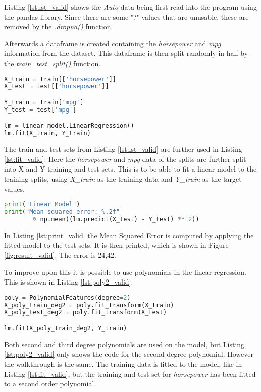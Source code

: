 Listing \ref{lst:lst_valid} shows the \emph{Auto} data being first read into the program using the pandas library. Since there are some "?" values that are unusable, these are removed by the \emph{.dropna()} function.

Afterwards a dataframe is created containing the \emph{horsepower} and \emph{mpg} information from the dataset. This dataframe is then split randomly in half by the \emph{train\_test\_split()} function. 

\begin{lstlisting}[language=Python, label=lst:fit_valid, caption=Fit linear regression]
X_train = train[['horsepower']]
X_test = test[['horsepower']]

Y_train = train['mpg']
Y_test = test['mpg']

lm = linear_model.LinearRegression()
lm.fit(X_train, Y_train)
\end{lstlisting}

The train and test sets from Listing \ref{lst:lst_valid} are further used in Listing \ref{lst:fit_valid}. Here the \emph{horsepower} and \emph{mpg} data of the splits are further split into X and Y training and test sets. This is to be able to fit a linear model to the training splits, using \emph{X\_train} as the training data and \emph{Y\_train} as the target values.

\begin{lstlisting}[language=Python, label=lst:print_valid, caption=Fit linear regression]
print("Linear Model")
print("Mean squared error: %.2f" 
		% np.mean((lm.predict(X_test) - Y_test) ** 2))
\end{lstlisting}

In Listing \ref{lst:print_valid} the Mean Squared Error is computed by applying the fitted model to the test sets. It is then printed, which is shown in Figure \ref{fig:result_valid}. The error is 24,42. 

To improve upon this it is possible to use polynomials in the linear regression. This is shown in Listing \ref{lst:poly2_valid}.

\begin{lstlisting}[language=Python, label=lst:poly2_valid, caption=Polynomial features with degree = 2]
poly = PolynomialFeatures(degree=2)
X_poly_train_deg2 = poly.fit_transform(X_train)
X_poly_test_deg2 = poly.fit_transform(X_test)

lm.fit(X_poly_train_deg2, Y_train)
\end{lstlisting}

Both second and third degree polynomials are used on the model, but Listing \ref{lst:poly2_valid} only shows the code for the second degree polynomial. However the walkthrough is the same. The training data is fitted to the model, like in Listing \ref{lst:fit_valid}, but the training and test set for \emph{horsepower} has been fitted to a second order polynomial. 

